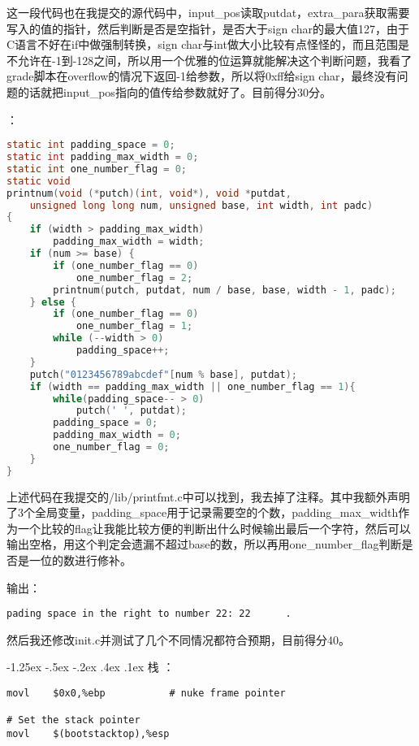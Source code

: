 \documentclass[a4paper, 11pt]{ctexart}
\makeatletter
\newcommand{\xiaosihao}{\fontsize{12pt}{\baselineskip}\selectfont}
\renewcommand\subsection{\@startsection{subsection}{1}{\z@}%
{-1.25ex \@plus -.5ex \@minus -.2ex}%
{.4ex \@plus .1ex}%
{\normalfont\xiaosihao\CJKfamily{hei}}}
\makeatother
\begin{document}
这一段代码也在我提交的源代码中，input\_pos读取putdat，extra\_para获取需要写入的值的指针，然后判断是否是空指针，是否大于sign char的最大值127，由于C语言不好在if中做强制转换，sign char与int做大小比较有点怪怪的，而且范围是不允许在-1到-128之间，所以用一个优雅的位运算就能解决这个判断问题，我看了grade脚本在overflow的情况下返回-1给参数，所以将0xff给sign char，最终没有问题的话就把input\_pos指向的值传给参数就好了。目前得分30分。

\color{red}{练习10}：\color{black}

\begin{lstlisting}[language={C}]
static int padding_space = 0;
static int padding_max_width = 0;
static int one_number_flag = 0;
static void
printnum(void (*putch)(int, void*), void *putdat,
	unsigned long long num, unsigned base, int width, int padc)
{
    if (width > padding_max_width)
        padding_max_width = width;
    if (num >= base) {
    	if (one_number_flag == 0)
            one_number_flag = 2;
        printnum(putch, putdat, num / base, base, width - 1, padc);
    } else {
        if (one_number_flag == 0)
            one_number_flag = 1;
        while (--width > 0)
            padding_space++;
    }
    putch("0123456789abcdef"[num % base], putdat);
    if (width == padding_max_width || one_number_flag == 1){
        while(padding_space-- > 0) 
            putch(' ', putdat);
        padding_space = 0;
        padding_max_width = 0;
        one_number_flag = 0;
    }
}
\end{lstlisting}

上述代码在我提交的/lib/printfmt.c中可以找到，我去掉了注释。其中我额外声明了3个全局变量，padding\_space用于记录需要空的个数，padding\_max\_width作为一个比较的flag让我能比较方便的判断出什么时候输出最后一个字符，然后可以输出空格，用这个判定会遗漏不超过base的数，所以再用one\_number\_flag判断是否是一位的数进行修补。

输出：
\begin{lstlisting}[numbers=none]
pading space in the right to number 22: 22      .
\end{lstlisting}

然后我还修改init.c并测试了几个不同情况都符合预期，目前得分40。

\subsection{栈}
\color{red}{练习11}：\color{black}

\begin{lstlisting}[language={[x86masm]Assembler}]
movl	$0x0,%ebp			# nuke frame pointer

# Set the stack pointer
movl	$(bootstacktop),%esp
\end{lstlisting}
\end{document}
